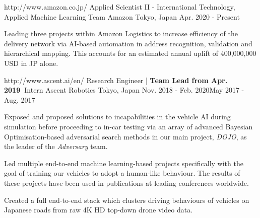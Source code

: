 

\begin{cventries}

  \cventry
    {http://www.amazon.co.jp/}
    {Applied Scientist II - International Technology, Applied Machine Learning Team} %
    {Amazon} %
    {Tokyo, Japan} %
    {Apr. 2020 - Present} %
    {
      \begin{cvitems} %
        \item {Leading three projects within Amazon Logistics to increase efficiency of the delivery network via AI-based automation in address recognition, validation and hierarchical mapping. This accounts for an estimated annual uplift of 400,000,000 USD in JP alone.}
      \end{cvitems}
    }


  \cventry
    {http://www.ascent.ai/en/}
    {Research Engineer | \textbf{Team Lead from Apr. 2019~}\linebreak Intern} %
    {Ascent Robotics} %
    {Tokyo, Japan} %
    {Nov. 2018 - Feb. 2020\linebreak May 2017 - Aug. 2017} %
    {
      \begin{cvitems} %
        \item {Exposed and proposed solutions to incapabilities in the vehicle AI during simulation before proceeding to in-car testing via an array of advanced Bayesian Optimisation-based adversarial search methods in our main project, \emph{DOJO}, as the leader of the \emph{Adversary} team.}
        \item {Led multiple end-to-end machine learning-based projects specifically with the goal of training our vehicles to adopt a human-like behaviour. The results of these projects have been used in publications at leading conferences worldwide.}
        \item {Created a full end-to-end stack which clusters driving behaviours of vehicles on Japanese roads from raw 4K HD top-down drone video data.}
      \end{cvitems}
    }


\end{cventries}
